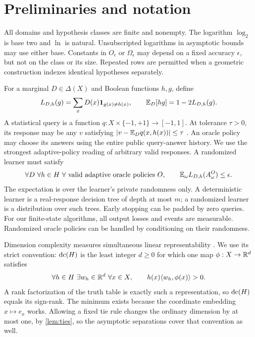 \section{Preliminaries and notation}\label{sec:preliminaries}
All domains and hypothesis classes are finite and nonempty. The logarithm $\log_2$ is base two and $\ln$ is natural. Unsubscripted logarithms in asymptotic bounds may use either base. Constants in $O_\epsilon$ or $\Omega_\epsilon$ may depend on a fixed accuracy $\epsilon$, but not on the class or its size. Repeated rows are permitted when a geometric construction indexes identical hypotheses separately.

For a marginal $D\in\Delta(X)$ and Boolean functions $h,g$, define
\[
 L_{D,h}(g)=\sum_xD(x)\mathbf 1_{g(x)\ne h(x)},\qquad
 \mathbb E_D[hg]=1-2L_{D,h}(g).
\]
A statistical query is a function $q:X\times\{-1,+1\}\to[-1,1]$. At tolerance $\tau>0$, its response may be any $v$ satisfying
$|v-\mathbb E_Dq(x,h(x))|\le\tau$ \citep{Kearns98}. An oracle policy may choose its answers using the entire public query-answer history. We use the strongest adaptive-policy reading of arbitrary valid responses. A randomized learner must satisfy
\begin{equation}\label{eq:guarantee}
 \forall D\ \forall h\in H\ \forall\text{ valid adaptive oracle policies }O,
 \qquad\mathbb E_\omega L_{D,h}(A^O_\omega)\le\epsilon.
\end{equation}
The expectation is over the learner's private randomness only. A deterministic learner is a real-response decision tree of depth at most $m$; a randomized learner is a distribution over such trees. Early stopping can be padded by zero queries. For our finite-state algorithms, all output losses and events are measurable. Randomized oracle policies can be handled by conditioning on their randomness.

Dimension complexity measures simultaneous linear representability \citep{BDES02}. We use its strict convention: $\operatorname{dc}(H)$ is the least integer $d\ge0$ for which one map $\phi:X\to\mathbb R^d$ satisfies
\begin{equation}\label{eq:strict}
 \forall h\in H\ \exists w_h\in\mathbb R^d\ \forall x\in X,
 \qquad h(x)\langle w_h,\phi(x)\rangle>0.
\end{equation}
A rank factorization of the truth table is exactly such a representation, so $\operatorname{dc}(H)$ equals its sign-rank. The minimum exists because the coordinate embedding $x\mapsto e_x$ works. Allowing a fixed tie rule changes the ordinary dimension by at most one, by \cref{lem:ties}, so the asymptotic separations cover that convention as well.

